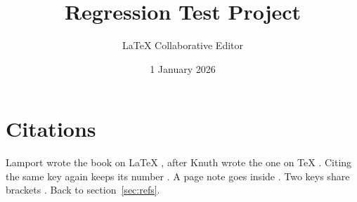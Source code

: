 \documentclass{article}
\title{Regression Test Project}
\author{LaTeX Collaborative Editor}
\date{1 January 2026}
\begin{document}
\maketitle








% 



\newpage

\section{Citations}
\label{sec:citations}
Lamport wrote the book on \LaTeX{} \cite{lamport}, after Knuth wrote the one on \TeX{} \cite{knuth}.
Citing the same key again keeps its number \cite{knuth}. A page note goes inside \cite[p.~5]{literate}.
Two keys share brackets \cite{bibtex,lamport}.
\nocite{vonname}
Back to section~\ref{sec:refs}.





\end{document}
